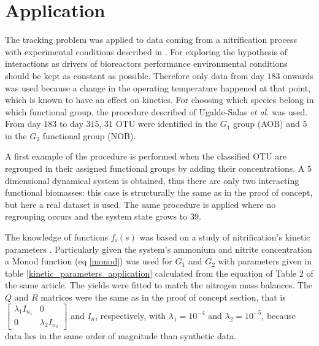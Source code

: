 \documentclass[processes,article,submit,moreauthors,pdftex]{Definitions/mdpi}
\begin{document}

\clearpage
\section{Application}


The tracking problem was applied to data coming from a nitrification process with experimental conditions described in \cite{dumont2008observers}. For exploring the hypothesis of interactions as drivers of bioreactors performance environmental conditions should be kept as constant as possible. Therefore only data from day $183$ onwards was used because a change in the operating temperature happened at that point, which is known to have an effect on kinetics. For choosing which species belong in which functional group, the procedure described of Ugalde-Salas \textit{et al.} \cite{Ugalde-Salas2019} was used. From day $183$ to day $315$, 31 OTU were identified in the $G_1$ group (AOB) and 5 in the $G_2$ functional group (NOB). 

A first example of the procedure is performed when the classified OTU are regrouped in their assigned functional groups by adding their concentrations. A 5 dimensional dynamical system is obtained, thus there are only two interacting functional biomasses: this case is structurally the same as in the proof of concept, but here a real dataset is used. The same procedure is applied where no regrouping occurs and the system state grows to 39. 

The knowledge of functions $f_i(s)$ was based on a study of nitrification's kinetic parameters \cite{Wiesmann1994}. Particularly given the system's ammonium and nitrite concentration a Monod function (eq \eqref{monod}) was used for $G_1$ and $G_2$ with parameters given in table \ref{kinetic_parameters_application} calculated from the equation of Table 2 of the same article. The yields were fitted to match the nitrogen mass balances. The $Q$ and $R$ matrices were the same as in the proof of concept section, that is $\begin{bmatrix}
\lambda_1 I_{n_1} &0  \\ 0& \lambda_2 I_{n_2}
\end{bmatrix}$ and $I_n$, respectively, with $\lambda_1 = 10^{-4}$ and $\lambda_2 = 10^{-5}$, because data lies in the same order of magnitude than synthetic data.
\end{document}

